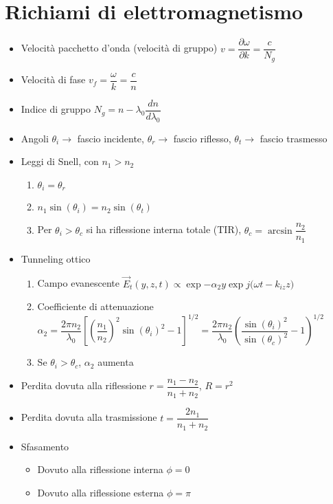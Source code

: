\documentclass{article}
\begin{document}
\section{Richiami di elettromagnetismo}
\begin{itemize}
	\item Velocità pacchetto d'onda (velocità di gruppo) \( v = \dfrac{\partial \omega}{\partial k} = \dfrac{c}{N_g} \)
	\item Velocità di fase \( v_f = \dfrac{\omega}{k} = \dfrac{c}{n}  \)
	\item Indice di gruppo \( N_g = n - \lambda_0 \dfrac{dn}{d\lambda_0} \)
	\item Angoli \( \theta_i \rightarrow \) fascio incidente, \( \theta_r \rightarrow \) fascio riflesso, \( \theta_t \rightarrow \) fascio trasmesso    
	\item Leggi di Snell, con \( n_1 > n_2 \)
	\begin{enumerate}
		\item \( \theta_i = \theta_r \)
		\item \( n_1 \sin(\theta_i) = n_2 \sin(\theta_t) \)
		\item Per \( \theta_i > \theta_c \) si ha riflessione interna totale (TIR), \( \theta_c = \arcsin\dfrac{n_2}{n_1} \)
	\end{enumerate}
	\item Tunneling ottico 
	\begin{enumerate}
		\item Campo evanescente \( \vec{E}_t(y, z, t) \propto \exp{-\alpha_2 y} \exp{j (\omega t - k_{iz} z}) \)
		\item Coefficiente di attenuazione \( \alpha_2 = \dfrac{2 \pi n_2}{\lambda_0} \left[\left(\dfrac{n_1}{n_2}\right)^2 \sin(\theta_i)^2 - 1\right] ^ {1/2} = \dfrac{2 \pi n_2}{\lambda_0} \left(\dfrac{\sin(\theta_i)^2}{\sin(\theta_c)^2} - 1 \right) ^ {1/2} \)
		\item Se \( \theta_i > \theta_c\), \(\alpha_2 \) aumenta
	\end{enumerate}
	\item Perdita dovuta alla riflessione \( r = \dfrac{n_1-n_2}{n_1+n_2} \), \( R = r^2 \)
	\item Perdita dovuta alla trasmissione \( t = \dfrac{2n_1}{n_1 + n_2} \)
	\item Sfasamento
	\begin{itemize}
		\item Dovuto alla riflessione interna \( \phi = 0 \)
		\item Dovuto alla riflessione esterna \( \phi = \pi \)

\end{itemize}
\end{itemize}
\end{document}
